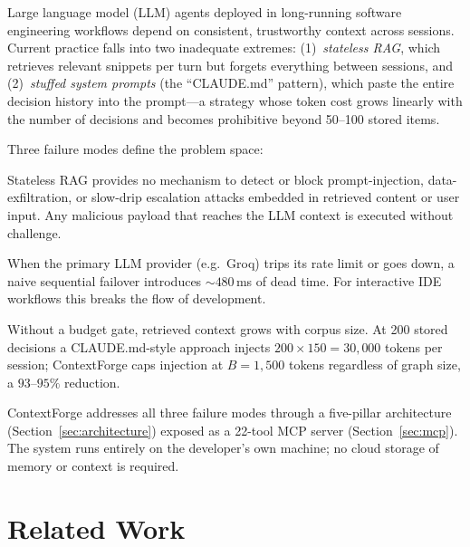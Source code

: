 \documentclass[11pt]{article}
\begin{document}
Large language model (LLM) agents deployed in long-running software engineering
workflows depend on consistent, trustworthy context across sessions.
Current practice falls into two inadequate extremes: (1)~\emph{stateless RAG},
which retrieves relevant snippets per turn but forgets everything between
sessions, and (2)~\emph{stuffed system prompts} (the ``CLAUDE.md'' pattern),
which paste the entire decision history into the prompt---a strategy whose
token cost grows linearly with the number of decisions and becomes prohibitive
beyond 50--100 stored items.

Three failure modes define the problem space:

\begin{description}[style=nextline]
  \item[Failure Mode 1 --- Zero adversarial resilience.]
    Stateless RAG provides no mechanism to detect or block prompt-injection,
    data-exfiltration, or slow-drip escalation attacks embedded in retrieved
    content or user input. Any malicious payload that reaches the LLM context
    is executed without challenge.

  \item[Failure Mode 2 --- High failover latency.]
    When the primary LLM provider (e.g.\ Groq) trips its rate limit or goes
    down, a naive sequential failover introduces ${\sim}480$\,ms of dead time.
    For interactive IDE workflows this breaks the flow of development.

  \item[Failure Mode 3 --- Unconstrained context injection.]
    Without a budget gate, retrieved context grows with corpus size.
    At 200 stored decisions a CLAUDE.md-style approach injects
    $200 \times 150 = 30{,}000$ tokens per session;
    ContextForge caps injection at $B = 1{,}500$ tokens regardless of graph
    size, a $93$--$95\%$ reduction.
\end{description}

ContextForge addresses all three failure modes through a five-pillar
architecture (Section~\ref{sec:architecture}) exposed as a 22-tool MCP server
(Section~\ref{sec:mcp}). The system runs entirely on the developer's own
machine; no cloud storage of memory or context is required.

\section{Related Work}
\label{sec:related}
\end{document}
